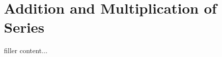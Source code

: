 \documentclass[../../templates/section]{subfiles}
\begin{document}
\section{Addition and Multiplication of Series}\label{sec:addition-and-multiplication-of-series}

filler content...
\end{document}
